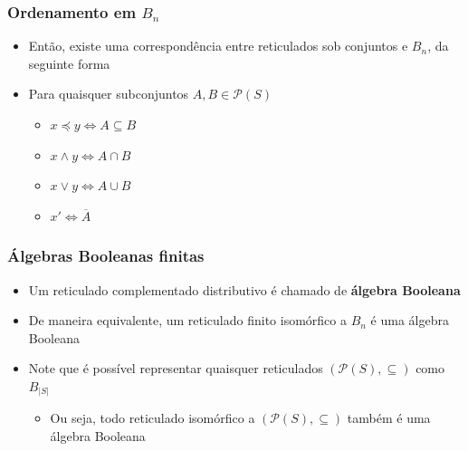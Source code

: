 \documentclass[12pt]{beamer}
\begin{document}
\begin{frame}
  \frametitle{Ordenamento em $B_{n}$}
  \begin{itemize}
    \item<1-> Então, existe uma correspondência entre reticulados sob conjuntos
        e $B_{n}$, da seguinte forma
    \item Para quaisquer subconjuntos $A, B \in \mathcal{P}(S)$
    \begin{itemize}[itemsep=0pt]
      \item<2-> $x \preccurlyeq y \Leftrightarrow A \subseteq B$
      \item<3-> $x \wedge y \Leftrightarrow A \cap B$
      \item<4-> $x \vee y \Leftrightarrow A \cup B$
      \item<5-> $x' \Leftrightarrow \overline{A}$
    \end{itemize}
  \end{itemize}
\end{frame}

\begin{frame}
  \frametitle{Álgebras Booleanas finitas}
  \begin{itemize}
    \item Um reticulado complementado distributivo é chamado de
        \textbf{álgebra Booleana}
    \item De maneira equivalente, um reticulado finito isomórfico a $B_{n}$ é
        uma álgebra Booleana
    \item Note que é possível representar quaisquer reticulados
        $(\mathcal{P}(S), \subseteq)$ como $B_{|S|}$
    \begin{itemize}
      \item Ou seja, todo reticulado isomórfico a $(\mathcal{P}(S),
          \subseteq)$ também é uma álgebra Booleana
    \end{itemize}
  \end{itemize}
\end{frame}
\end{document}
